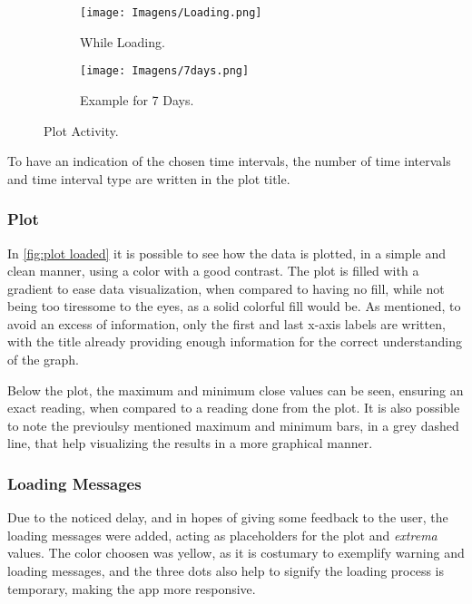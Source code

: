 \documentclass{article}
\begin{document}
\begin{figure}[ht]
    \centering
    
    \begin{subfigure}[t]{0.49\textwidth}
        \centering
        \texttt{[image: Imagens/Loading.png]}
        \caption{While Loading.}
        \label{fig:loading}
    \end{subfigure}
    \hfill
    \begin{subfigure}[t]{0.49\textwidth}
        \centering
        \texttt{[image: Imagens/7days.png]}
        \caption{Example for 7 Days.}
        \label{fig:plot loaded}
    \end{subfigure}

    \caption{Plot Activity.}
    \label{fig:plot activity}
\end{figure}

To have an indication of the chosen time intervals, the number of time intervals and time interval type are written in the plot title.

\subsubsection{Plot}
In \autoref{fig:plot loaded} it is possible to see how the data is plotted, in a simple and clean manner, using a color with a good contrast.
The plot is filled with a gradient to ease data visualization, when compared to having no fill, while not being too tiressome to the eyes, as a solid colorful fill would be.
As mentioned, to avoid an excess of information, only the first and last x-axis labels are written, with the title already providing enough information for the correct understanding of the graph.

Below the plot, the maximum and minimum close values can be seen, ensuring an exact reading, when compared to a reading done from the plot.
It is also possible to note the previoulsy mentioned maximum and minimum bars, in a grey dashed line, that help visualizing the results in a more graphical manner.

\subsubsection{Loading Messages}
\label{sec:loading messages}
Due to the noticed delay, and in hopes of giving some feedback to the user, the loading messages were added, acting as placeholders for the plot and \textit{extrema} values.
The color choosen was yellow, as it is costumary to exemplify warning and loading messages, and the three dots also help to signify the loading process is temporary, making the app more responsive.
\end{document}
